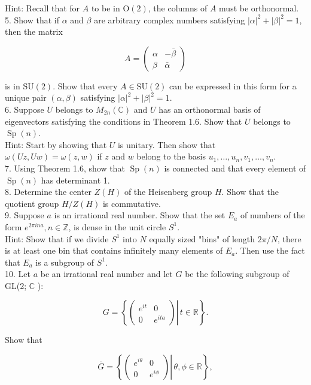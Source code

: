 \documentclass[10pt, letterpaper]{article}
\begin{document}
Hint: Recall that for $A$ to be in $\mathrm{O}(2)$, the columns of $A$ must be orthonormal.\\
5. Show that if $\alpha$ and $\beta$ are arbitrary complex numbers satisfying $|\alpha|^{2}+|\beta|^{2}=1$, then the matrix

$$
A=\left(\begin{array}{rr}
\alpha & -\bar{\beta} \\
\beta & \bar{\alpha}
\end{array}\right)
$$

is in $\mathrm{SU}(2)$. Show that every $A \in \mathrm{SU}(2)$ can be expressed in this form for a unique pair $(\alpha, \beta)$ satisfying $|\alpha|^{2}+|\beta|^{2}=1$.\\
6. Suppose $U$ belongs to $M_{2 n}(\mathbb{C})$ and $U$ has an orthonormal basis of eigenvectors satisfying the conditions in Theorem 1.6. Show that $U$ belongs to $\operatorname{Sp}(n)$.\\
Hint: Start by showing that $U$ is unitary. Then show that $\omega(U z, U w)=\omega(z, w)$ if $z$ and $w$ belong to the basis $u_{1}, \ldots, u_{n}, v_{1}, \ldots, v_{n}$.\\
7. Using Theorem 1.6, show that $\operatorname{Sp}(n)$ is connected and that every element of $\operatorname{Sp}(n)$ has determinant 1.\\
8. Determine the center $Z(H)$ of the Heisenberg group $H$. Show that the quotient group $H / Z(H)$ is commutative.\\
9. Suppose $a$ is an irrational real number. Show that the set $E_{a}$ of numbers of the form $e^{2 \pi i n a}, n \in \mathbb{Z}$, is dense in the unit circle $S^{1}$.\\
Hint: Show that if we divide $S^{1}$ into $N$ equally sized "bins" of length $2 \pi / N$, there is at least one bin that contains infinitely many elements of $E_{a}$. Then use the fact that $E_{a}$ is a subgroup of $S^{1}$.\\
10. Let $a$ be an irrational real number and let $G$ be the following subgroup of GL(2; $\mathbb{C}$ ):

$$
G=\left\{\left.\left(\begin{array}{cc}
e^{i t} & 0 \\
0 & e^{i t a}
\end{array}\right) \right\rvert\, t \in \mathbb{R}\right\} .
$$

Show that

$$
\bar{G}=\left\{\left.\left(\begin{array}{cc}
e^{i \theta} & 0 \\
0 & e^{i \phi}
\end{array}\right) \right\rvert\, \theta, \phi \in \mathbb{R}\right\},
$$
\end{document}
